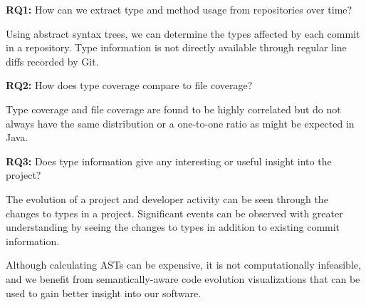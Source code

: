 \textbf{RQ1:} How can we extract type and method usage from repositories over time?

\begin{framed}
\noindent
Using abstract syntax trees, we can determine the types affected by each commit in a repository. Type information is not directly available through regular line diffs recorded by Git.
\end{framed}

\textbf{RQ2:} How does type coverage compare to file coverage?

\begin{framed}
\noindent
Type coverage and file coverage are found to be highly correlated but do not always have the same distribution or a one-to-one ratio as might be expected in Java.
\end{framed}

\textbf{RQ3:} Does type information give any interesting or useful insight into the project?

\begin{framed}
\noindent
The evolution of a project and developer activity can be seen through the changes to types in a project. Significant events can be observed with greater understanding by seeing the changes to types in addition to existing commit information.
\end{framed}

Although calculating ASTs can be expensive, it is not computationally infeasible, and we benefit from semantically-aware code evolution visualizations that can be used to gain better insight into our software.




